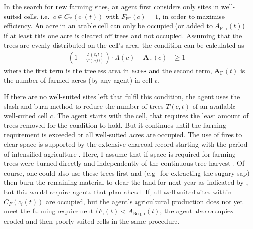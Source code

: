 In the search for new farming sites, an agent first considers only sites in well-suited cells, i.e.\ $c \in C_\text{F}(c_\text{i}(t))$ with $F_\text{PI}(c)=1$, in order to maximise efficiency.
An acre in an arable cell can only be occupied (or added to $A_\text{F, i}(t)$) if at least this one acre is cleared off trees and not occupied. 
Assuming that the trees are evenly distributed on the cell's area, the condition can be calculated as 
\begin{eqnarray}
\left( 1 - \frac{T(c,t)}{T(c,0)} \right) \cdot A(c) - \mathbf{A}_\text{F}(c) & \geq   1
\label{eq:BurningCond}
\end{eqnarray}
where the first term is the treeless area in ${\rm acres}$ and the second term, $\mathbf{A}_\text{F}(t)$ is the number of farmed acres (by any agent) in cell $c$.

If there are no well-suited sites left that fulfil this condition, the agent uses the slash and burn method to reduce the number of trees $T(c,t)$ of an available well-suited cell $c$.
The agent starts with the cell, that requires the least amount of trees removed for the condition to hold.
But it continues until the farming requirement is exceeded or all well-suited acres are occupied.
The use of fires to clear space is supported by the extensive charcoal record starting with the period of intensified agriculture \citep{Mieth2015}. 
Here, I assume that if space is required for farming trees were burned directly and independently of the continuous tree harvest .
Of course, one could also use these trees first and (e.g.\ for extracting the sugary sap) then burn the remaining material to clear the land for next year as indicated by \citet{Mieth2015}, but this would require agents that plan ahead.
If, all well-suited sites within $C_F(c_i(t))$ are occupied, but the agent's agricultural production does not yet meet the farming requirement ($F_\text{i}(t)<A_\text{Req, i}(t)$, the agent also occupies eroded and then  poorly suited cells in the same procedure.

\TODO

